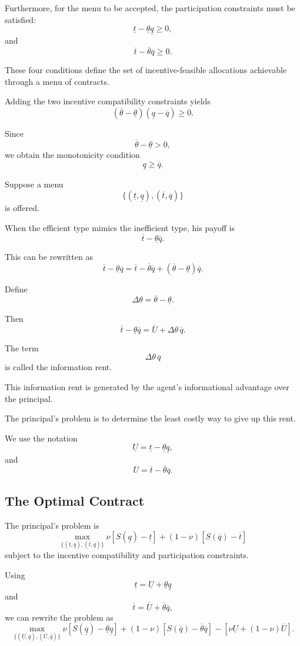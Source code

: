 Furthermore, for the menu to be accepted, the participation constraints must be satisfied:
\[
\underline t-\underline{\theta}\underline q
\ge 0,
\]
and
\[
\overline t-\overline{\theta}\overline q
\ge 0.
\]

These four conditions define the set of incentive-feasible allocations achievable through a menu of contracts.

Adding the two incentive compatibility constraints yields
\[
(\overline{\theta}-\underline{\theta})(\underline q-\overline q)\ge 0.
\]

Since
\[
\overline{\theta}-\underline{\theta}>0,
\]
we obtain the monotonicity condition
\[
\underline q\ge \overline q.
\]

Suppose a menu
\[
\{(\underline t,\underline q),(\overline t,\overline q)\}
\]
is offered.

When the efficient type mimics the inefficient type, his payoff is
\[
\overline t-\underline{\theta}\overline q.
\]

This can be rewritten as
\[
\overline t-\underline{\theta}\overline q
=
\overline t-\overline{\theta}\overline q
+
(\overline{\theta}-\underline{\theta})\overline q.
\]

Define
\[
\Delta\theta
=
\overline{\theta}-\underline{\theta}.
\]

Then
\[
\overline t-\underline{\theta}\overline q
=
\overline U+\Delta\theta\,\overline q.
\]

The term
\[
\Delta\theta\,\overline q
\]
is called the information rent.

This information rent is generated by the agent's informational advantage over the principal.

The principal's problem is to determine the least costly way to give up this rent.

We use the notation
\[
\underline U
=
\underline t-\underline{\theta}\underline q,
\]
and
\[
\overline U
=
\overline t-\overline{\theta}\overline q.
\]

\subsection{The Optimal Contract}

The principal's problem is
\[
\max_{\{(\underline t,\underline q),(\overline t,\overline q)\}}
\nu
\left[
S(\underline q)-\underline t
\right]
+
(1-\nu)
\left[
S(\overline q)-\overline t
\right]
\]
subject to the incentive compatibility and participation constraints.

Using
\[
\underline t=\underline U+\underline{\theta}\underline q
\]
and
\[
\overline t=\overline U+\overline{\theta}\overline q,
\]
we can rewrite the problem as
\[
\max_{\{(\underline U,\underline q),(\overline U,\overline q)\}}
\nu
\left[
S(\underline q)-\underline{\theta}\underline q
\right]
+
(1-\nu)
\left[
S(\overline q)-\overline{\theta}\overline q
\right]
-
\left[
\nu\underline U+(1-\nu)\overline U
\right].
\]

